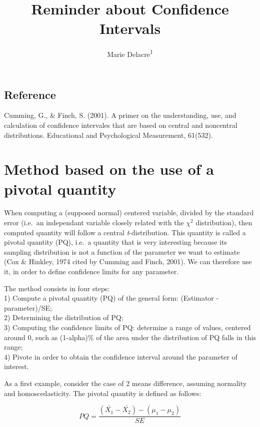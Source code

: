 \documentclass[
  man,floatsintext]{apa6}
\affiliation{
\vspace{0.5cm}
\textsuperscript{1} ULB}
\title{Reminder about Confidence Intervals}
\author{Marie Delacre\textsuperscript{1}}
\date{}
\begin{document}
\maketitle

\hypertarget{reference}{%
\subsection{Reference}\label{reference}}

Cumming, G., \& Finch, S. (2001). A primer on the understanding, use, and calculation of confidence intervales that are based on central and noncentral distributions. Educational and Psychological Measurement, 61(532).

\hypertarget{method-based-on-the-use-of-a-pivotal-quantity}{%
\section{Method based on the use of a pivotal quantity}\label{method-based-on-the-use-of-a-pivotal-quantity}}

When computing a (supposed normal) centered variable, divided by the standard error (i.e.~an independant variable closely related with the \(\chi^2\) distribution), then computed quantity will follow a central \emph{t}-distribution. This quantity is called a pivotal quantity (PQ), i.e.~a quantity that is very interesting because its sampling distribution is not a function of the parameter we want to estimate (Cox \& Hinkley, 1974 cited by Cumming and Finch, 2001). We can therefore use it, in order to define confidence limits for any parameter.

The method consists in four steps:\\
1) Compute a pivotal quantity (PQ) of the general form: (Estimator - parameter)/SE;\\
2) Determining the distribution of PQ;\\
3) Computing the confidence limits of PQ: determine a range of values, centered around 0, such as (1-alpha)\% of the area under the distribution of PQ falls in this range;\\
4) Pivote in order to obtain the confidence interval around the parameter of interest.

As a first example, consider the case of 2 means difference, assuming normality and homoscedasticity. The pivotal quantity is defined as follows:

\begin{equation} 
PQ= \frac{(\bar{X_1}-\bar{X_2})-(\mu_1-\mu_2)}{SE}
\label{eq:PQstudent}
\end{equation}
\end{document}
